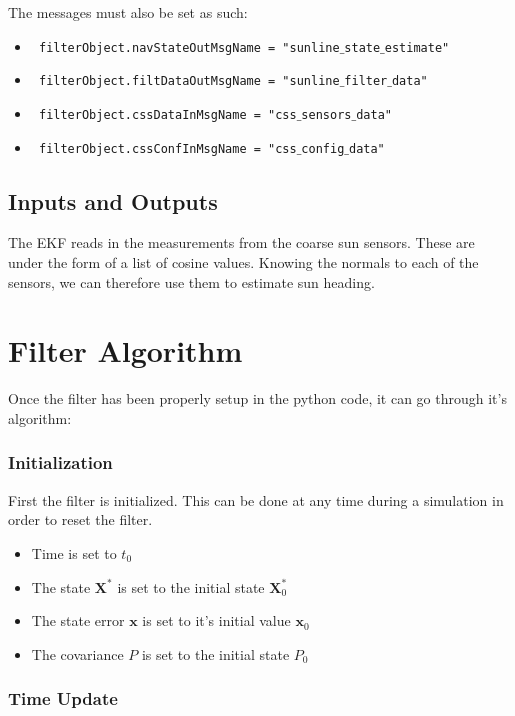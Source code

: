 \documentclass[]{BasiliskReportMemo}
\begin{document}
The messages must also be set as such:

\begin{itemize}
\item    \texttt{ filterObject.navStateOutMsgName = "sunline$\_$state$\_$estimate"}
\item    \texttt{ filterObject.filtDataOutMsgName = "sunline$\_$filter$\_$data"}
\item   \texttt{ filterObject.cssDataInMsgName = "css$\_$sensors$\_$data"}
\item   \texttt{ filterObject.cssConfInMsgName = "css$\_$config$\_$data"}
\end{itemize}

\subsection{Inputs and Outputs}

The EKF reads in the measurements from the coarse sun sensors. These are under the form of a list of cosine values. Knowing the normals to each of the sensors, we can therefore use them to estimate sun heading.

\section{Filter Algorithm}

Once the filter has been properly setup in the python code, it can go through it's algorithm:

\subsubsection*{Initialization}

First the filter is initialized. This can be done at any time during a simulation in order to reset 
the filter. 

\begin{itemize}
\item Time is set to $t_0$
\item The state $\bm X^*$ is set to the initial state  $\bm X_0^*$
\item The state error $\bm x$ is set to it's initial value $\bm x_0$
\item The covariance $P$ is set to the initial state  $P_0$
\end{itemize}


\subsubsection*{Time Update}
\end{document}
